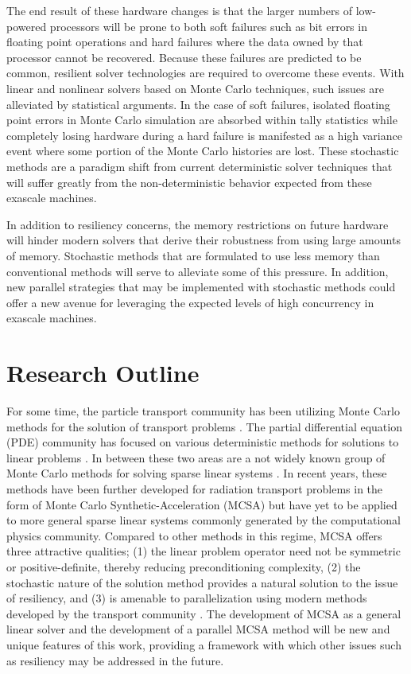 The end result of these hardware changes is that the larger numbers of
low-powered processors will be prone to both soft failures such as bit
errors in floating point operations and hard failures where the data
owned by that processor cannot be recovered. Because these failures
are predicted to be common, resilient solver technologies are required
to overcome these events. With linear and nonlinear solvers based on
Monte Carlo techniques, such issues are alleviated by statistical
arguments. In the case of soft failures, isolated floating point
errors in Monte Carlo simulation are absorbed within tally statistics
while completely losing hardware during a hard failure is manifested
as a high variance event where some portion of the Monte Carlo
histories are lost. These stochastic methods are a paradigm shift from
current deterministic solver techniques that will suffer greatly from
the non-deterministic behavior expected from these exascale machines.

In addition to resiliency concerns, the memory restrictions on future
hardware will hinder modern solvers that derive their robustness from
using large amounts of memory. Stochastic methods that are formulated
to use less memory than conventional methods will serve to alleviate
some of this pressure. In addition, new parallel strategies that may
be implemented with stochastic methods could offer a new avenue for
leveraging the expected levels of high concurrency in exascale
machines.

\section{Research Outline}
\label{sec:research_outline}
For some time, the particle transport community has been utilizing
Monte Carlo methods for the solution of transport problems
\citep{lewis_computational_1993}. The partial differential equation
(PDE) community has focused on various deterministic methods for
solutions to linear problems \citep{saad_iterative_2003,
  kelley_iterative_1995}. In between these two areas are a not widely
known group of Monte Carlo methods for solving sparse linear systems
\citep{forsythe_matrix_1950, hammersley_monte_1964,
  halton_sequential_1962, halton_sequential_1994}. In recent years,
these methods have been further developed for radiation transport
problems in the form of Monte Carlo Synthetic-Acceleration (MCSA)
\citep{evans_monte_2009, evans_monte_2012} but have yet to be applied
to more general sparse linear systems commonly generated by the
computational physics community. Compared to other methods in this
regime, MCSA offers three attractive qualities; (1) the linear problem
operator need not be symmetric or positive-definite, thereby reducing
preconditioning complexity, (2) the stochastic nature of the solution
method provides a natural solution to the issue of resiliency, and (3)
is amenable to parallelization using modern methods developed by the
transport community \citep{wagner_hybrid_2010}. The development of
MCSA as a general linear solver and the development of a parallel MCSA
method will be new and unique features of this work, providing a
framework with which other issues such as resiliency may be addressed
in the future.

